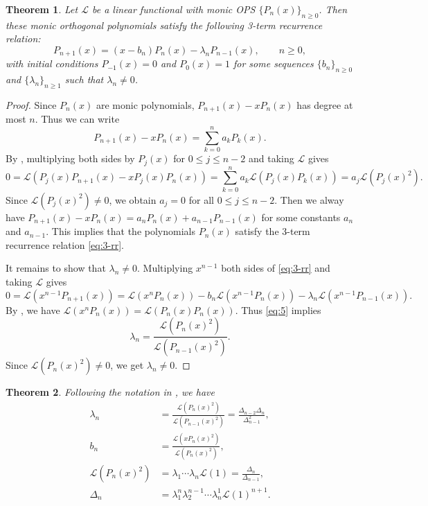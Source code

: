\documentclass[oneside]{book}
\numberwithin{equation}{section}
\newtheorem{thm}{Theorem}[section]
\theoremstyle{definition}
\newcommand\LL{\mathcal{L}}
\begin{document}
\begin{thm}\label{thm:3-RR}
  Let \( \LL \) be a linear functional with monic OPS
  \( \{ P_n(x) \}_{n\ge 0} \). Then these monic orthogonal polynomials
  satisfy the following 3-term recurrence relation:
  \begin{equation}\label{eq:3-rr}
    P_{n+1}(x) = (x-b_n) P_n(x) - \lambda_n P_{n-1}(x), \qquad n\ge0,
  \end{equation}
  with initial conditions \( P_{-1}(x) = 0 \) and \( P_0(x) = 1 \) for
  some sequences \( \{b_n\}_{n\ge0} \) and \( \{\lambda_n\}_{n\ge1} \)
  such that \( \lambda_n\ne 0 \).
\end{thm}
\begin{proof}
  Since \( P_n(x) \) are monic polynomials, \( P_{n+1}(x) - xP_n(x) \)
  has degree at most \( n \). Thus we can write
  \[
    P_{n+1}(x) - xP_n(x) = \sum_{k=0}^n a_k P_k(x).
  \]
  By , multiplying both sides by \( P_j(x) \) for \( 0\le j\le n-2 \)
  and taking \( \LL \) gives
  \[
 0 = \LL(P_j(x) P_{n+1}(x) - xP_j(x)P_n(x))
    = \sum_{k=0}^n a_k \LL(P_j(x) P_k(x))  = a_j \LL(P_j(x)^2).
  \]
  Since \( \LL(P_j(x)^2) \ne 0 \), we obtain \( a_j=0 \) for all
  \( 0\le j\le n-2 \). Then we alway have
  \( P_{n+1}(x) - xP_n(x) = a_nP_n(x) + a_{n-1}P_{n-1}(x) \) for some
  constants \( a_n \) and \( a_{n-1} \). This implies that the
  polynomials \( P_n(x) \) satisfy the 3-term recurrence relation
  \eqref{eq:3-rr}.

  It remains to show that \( \lambda_n\ne 0 \). Multiplying
  \( x^{n-1} \) both sides of \eqref{eq:3-rr} and taking \( \LL \)
  gives
  \begin{equation}\label{eq:5}
    0 = \LL(x^{n-1} P_{n+1}(x)) = \LL(x^nP_n(x)) - b_n \LL(x^{n-1}
    P_n(x)) - \lambda_n \LL(x^{n-1}P_{n-1}(x)).
  \end{equation}
  By , we have
  \( \LL(x^n P_n(x)) = \LL(P_n(x) P_n(x)) \). Thus \eqref{eq:5}
  implies
  \begin{equation}\label{eq:14}
  \lambda_n = \frac{\LL(P_n(x)^2)}{\LL(P_{n-1}(x)^2)}.
  \end{equation}
  Since \( \LL(P_n(x)^2)\ne0 \), we get \( \lambda_n\ne0 \).
\end{proof}

\begin{thm}
  Following the notation in , we have
  \begin{align}
    \label{eq:la=DD/D}
    \lambda_n &= \frac{\LL(P_n(x)^2)}{\LL(P_{n-1}(x)^2)} = \frac{\Delta_{n-2}\Delta_n}{\Delta_{n-1}^2}, \\
    \label{eq:b=xP/P}
    b_n &= \frac{\LL(xP_{n}(x)^2)}{\LL(P_{n}(x)^2)},\\
    \label{eq:P2=lala}
    \LL(P_n(x)^2) &= \lambda_1\cdots\lambda_{n} \LL(1) = \frac{\Delta_n}{\Delta_{n-1}}, \\
    \label{eq:D=lala}
    \Delta_n &= \lambda_1^{n}\lambda_2^{n-1}\cdots\lambda_{n}^1 \LL(1)^{n+1}.
  \end{align}
\end{thm}
\end{document}
